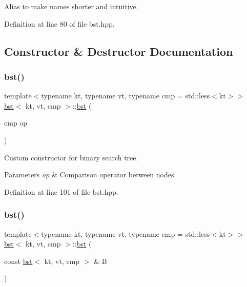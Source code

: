 Alias to make names shorter and intuitive. 

Definition at line 80 of file bst.\+hpp.



\subsection{Constructor \& Destructor Documentation}
\mbox{\label{classbst_a8d0c20c3ace61d4ffde5ab90fbe3226b}} 
\subsubsection{\texorpdfstring{bst()}{bst()}\hspace{0.1cm}{\footnotesize\ttfamily [1/3]}}
{\footnotesize\ttfamily template$<$typename kt, typename vt, typename cmp = std\+::less$<$kt$>$$>$ \\
\hyperlink{classbst}{bst}$<$ kt, vt, cmp $>$\+::\hyperlink{classbst}{bst} (\begin{DoxyParamCaption}\item[{cmp}]{op }\end{DoxyParamCaption})\hspace{0.3cm}{\ttfamily [inline]}}



Custom constructor for binary search tree. 


\begin{DoxyParams}{Parameters}
{\em op} & Comparison operator between nodes. \\
\hline
\end{DoxyParams}


Definition at line 101 of file bst.\+hpp.

\mbox{\label{classbst_a2f94afc86338e90d9110b713383ab492}} 
\subsubsection{\texorpdfstring{bst()}{bst()}\hspace{0.1cm}{\footnotesize\ttfamily [2/3]}}
{\footnotesize\ttfamily template$<$typename kt, typename vt, typename cmp = std\+::less$<$kt$>$$>$ \\
\hyperlink{classbst}{bst}$<$ kt, vt, cmp $>$\+::\hyperlink{classbst}{bst} (\begin{DoxyParamCaption}\item[{const \hyperlink{classbst}{bst}$<$ kt, vt, cmp $>$ \&}]{B }\end{DoxyParamCaption})\hspace{0.3cm}{\ttfamily [inline]}}



